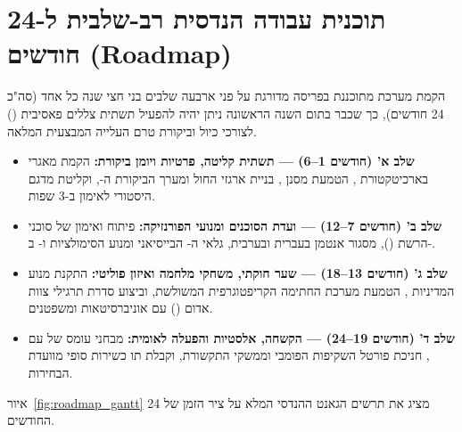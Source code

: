\section{תוכנית עבודה הנדסית רב-שלבית ל-24 חודשים (Roadmap)}
הקמת מערכת  מתוכננת בפריסה מדורגת על פני ארבעה שלבים בני חצי שנה כל אחד (סה"כ 24 חודשים), כך שכבר בתום השנה הראשונה ניתן יהיה להפעיל תשתית צללים פאסיבית () לצורכי כיול וביקורת טרם העלייה המבצעית המלאה.
\begin{itemize}
    \item \textbf{שלב א' (חודשים 1–6) — תשתית קליטה, פרטיות ויומן ביקורת:} הקמת מאגרי  בארכיטקטורת , הטמעת מסנן , בניית ארגזי החול ומערך הביקורת ה-, וקליטת מדגם היסטורי לאימון ב-3 שפות.
    \item \textbf{שלב ב' (חודשים 7–12) — ועדת הסוכנים ומנועי הפורנזיקה:} פיתוח ואימון של סוכני הרשת (), מסגור אנטמן בעברית ובערבית, גלאי ה- הבייסיאני ומנוע הסימולציות  ו- ב-.
    \item \textbf{שלב ג' (חודשים 13–18) — שער חוקתי, משחקי מלחמה ואיזון פוליטי:} התקנת מנוע המדיניות , הטמעת מערכת החתימה הקריפטוגרפית המשולשת, וביצוע סדרת תרגילי צוות אדום () עם אוניברסיטאות ומשפטנים.
    \item \textbf{שלב ד' (חודשים 19–24) — הקשחה, אלסטיות והפעלה לאומית:} מבחני עומס של  עם , חניכת פורטל השקיפות הפומבי וממשקי התקשורת, וקבלת תו כשירות סופי מוועדת הבחירות.
\end{itemize}

איור~\ref{fig:roadmap_gantt} מציג את תרשים הגאנט ההנדסי המלא על ציר הזמן של 24 החודשים.

